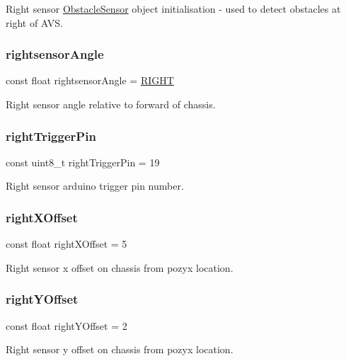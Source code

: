 Right sensor \mbox{\hyperlink{class_obstacle_sensor}{Obstacle\+Sensor}} object initialisation -\/ used to detect obstacles at right of A\+VS. 

\mbox{\label{bot_main_8ino_a83724535498f068d5b44150a2bc4fcf8}} 
\subsubsection{\texorpdfstring{rightsensor\+Angle}{rightsensorAngle}}
{\footnotesize\ttfamily const float rightsensor\+Angle = \mbox{\hyperlink{bot_main_8ino_a80fb826a684cf3f0d306b22aa100ddac}{R\+I\+G\+HT}}}



Right sensor angle relative to forward of chassis. 

\mbox{\label{bot_main_8ino_a906054d9d48970211789ac841d331898}} 
\subsubsection{\texorpdfstring{right\+Trigger\+Pin}{rightTriggerPin}}
{\footnotesize\ttfamily const uint8\+\_\+t right\+Trigger\+Pin = 19}



Right sensor arduino trigger pin number. 

\mbox{\label{bot_main_8ino_ac932cddb5bc68094c96d0034c92faef9}} 
\subsubsection{\texorpdfstring{right\+X\+Offset}{rightXOffset}}
{\footnotesize\ttfamily const float right\+X\+Offset = 5}



Right sensor x offset on chassis from pozyx location. 

\mbox{\label{bot_main_8ino_a07903b96b48e8e456debd9cc43c7af05}} 
\subsubsection{\texorpdfstring{right\+Y\+Offset}{rightYOffset}}
{\footnotesize\ttfamily const float right\+Y\+Offset = 2}



Right sensor y offset on chassis from pozyx location. 

